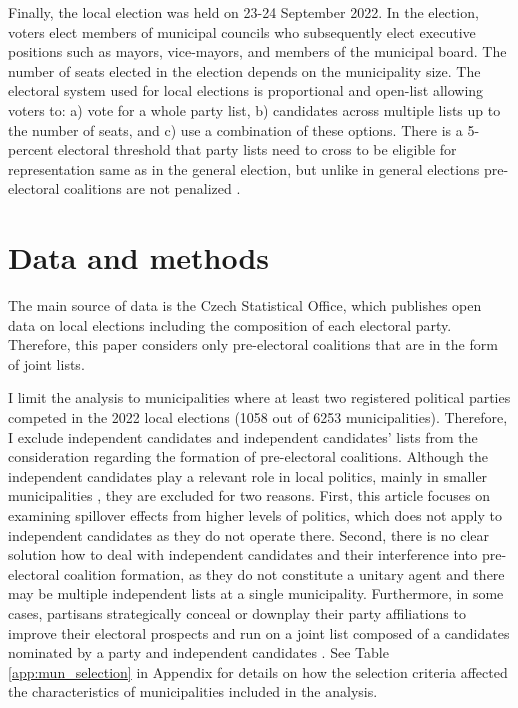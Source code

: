 \documentclass[]{interact}
\theoremstyle{plain}%
\theoremstyle{definition}
\theoremstyle{remark}
\begin{document}
Finally, the local election was held on 23-24 September 2022. In the election, voters elect members of municipal councils who subsequently elect executive positions such as mayors, vice-mayors, and members of the municipal board. The number of seats elected in the election depends on the municipality size. The electoral system used for local elections is proportional and open-list allowing voters to: a) vote for a whole party list, b) candidates across multiple lists up to the number of seats, and c) use a combination of these options. There is a 5-percent electoral threshold that party lists need to cross to be eligible for representation same as in the general election, but unlike in general elections pre-electoral coalitions are not penalized \citep{voda2022}. 

\section{Data and methods}

The main source of data is the Czech Statistical Office, which publishes open data on local elections including the composition of each electoral party. Therefore, this paper considers only pre-electoral coalitions that are in the form of joint lists. 

I limit the analysis to municipalities where at least two registered political parties competed in the 2022 local elections (1058 out of 6253 municipalities). Therefore, I exclude independent candidates and independent candidates' lists from the consideration regarding the formation of pre-electoral coalitions. Although the independent candidates play a relevant role in local politics, mainly in smaller municipalities \citep{kostelecky2023}, they are excluded for two reasons. First, this article focuses on examining spillover effects from higher levels of politics, which does not apply to independent candidates as they do not operate there. Second, there is no clear solution how to deal with independent candidates and their interference into pre-electoral coalition formation, as they do not constitute a unitary agent and there may be multiple independent lists at a single municipality. Furthermore, in some cases, partisans strategically conceal or downplay their party affiliations to improve their electoral prospects and run on a joint list composed of a candidates nominated by a party and independent candidates \citep[503]{kostelecky2023,gendzwill2012}. %
See Table \ref{app:mun_selection} in Appendix for details on how the selection criteria affected the characteristics of municipalities included in the analysis.
\end{document}
